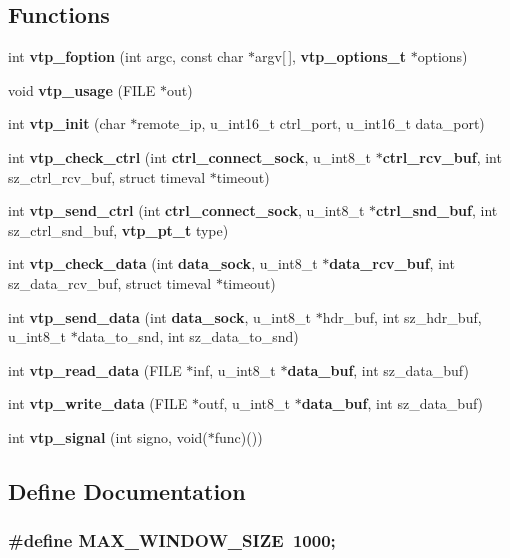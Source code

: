 \subsection*{Functions}
\begin{CompactItemize}
\item 
int {\bf vtp\_\-foption} (int argc, const char $\ast$argv[$\,$], {\bf vtp\_\-options\_\-t} $\ast$options)
\item 
void {\bf vtp\_\-usage} (FILE $\ast$out)
\item 
int {\bf vtp\_\-init} (char $\ast$remote\_\-ip, u\_\-int16\_\-t ctrl\_\-port, u\_\-int16\_\-t data\_\-port)
\item 
int {\bf vtp\_\-check\_\-ctrl} (int {\bf ctrl\_\-connect\_\-sock}, u\_\-int8\_\-t $\ast${\bf ctrl\_\-rcv\_\-buf}, int sz\_\-ctrl\_\-rcv\_\-buf, struct timeval $\ast$timeout)
\item 
int {\bf vtp\_\-send\_\-ctrl} (int {\bf ctrl\_\-connect\_\-sock}, u\_\-int8\_\-t $\ast${\bf ctrl\_\-snd\_\-buf}, int sz\_\-ctrl\_\-snd\_\-buf, {\bf vtp\_\-pt\_\-t} type)
\item 
int {\bf vtp\_\-check\_\-data} (int {\bf data\_\-sock}, u\_\-int8\_\-t $\ast${\bf data\_\-rcv\_\-buf}, int sz\_\-data\_\-rcv\_\-buf, struct timeval $\ast$timeout)
\item 
int {\bf vtp\_\-send\_\-data} (int {\bf data\_\-sock}, u\_\-int8\_\-t $\ast$hdr\_\-buf, int sz\_\-hdr\_\-buf, u\_\-int8\_\-t $\ast$data\_\-to\_\-snd, int sz\_\-data\_\-to\_\-snd)
\item 
int {\bf vtp\_\-read\_\-data} (FILE $\ast$inf, u\_\-int8\_\-t $\ast${\bf data\_\-buf}, int sz\_\-data\_\-buf)
\item 
int {\bf vtp\_\-write\_\-data} (FILE $\ast$outf, u\_\-int8\_\-t $\ast${\bf data\_\-buf}, int sz\_\-data\_\-buf)
\item 
int {\bf vtp\_\-signal} (int signo, void($\ast$func)())
\end{CompactItemize}


\subsection{Define Documentation}
\subsubsection{\setlength{\rightskip}{0pt plus 5cm}\#define MAX\_\-WINDOW\_\-SIZE\ 1000;}\label{vtp_8h_a1}


